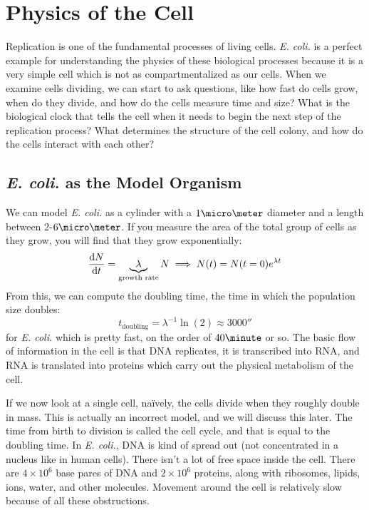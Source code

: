 \documentclass[a4paper,twoside,master.tex]{subfiles}
\begin{document}
\chapter{Physics of the Cell}


Replication is one of the fundamental processes of living cells. \textit{E. coli.} is a perfect example for understanding the physics of these biological processes because it is a very simple cell which is not as compartmentalized as our cells. When we examine cells dividing, we can start to ask questions, like how fast do cells grow, when do they divide, and how do the cells measure time and size? What is the biological clock that tells the cell when it needs to begin the next step of the replication process? What determines the structure of the cell colony, and how do the cells interact with each other?

\section{\textit{E. coli.} as the Model Organism}\label{sec:e_coli_as_the_model_organism}

We can model \textit{E. coli.} as a cylinder with a $ 1\micro\meter $ diameter and a length between $ 2 $-$ 6 \micro\meter $. If you measure the area of the total group of cells as they grow, you will find that they grow exponentially:
\begin{equation}
    \dv{N}{t} = \underbrace{\lambda}_{\text{growth rate}} N \implies N(t) = N(t=0) e^{\lambda t}
\end{equation}
From this, we can compute the doubling time, the time in which the population size doubles:
\begin{equation}
    t_{\text{doubling}} = \lambda^{-1} \ln(2) \approx 3000\second
\end{equation}
for \textit{E. coli.} which is pretty fast, on the order of $ 40\minute $ or so. The basic flow of information in the cell is that DNA replicates, it is transcribed into RNA, and RNA is translated into proteins which carry out the physical metabolism of the cell.


If we now look at a single cell, na\"ively, the cells divide when they roughly double in mass. This is actually an incorrect model, and we will discuss this later. The time from birth to division is called the cell cycle, and that is equal to the doubling time. In \textit{E. coli.}, DNA is kind of spread out (not concentrated in a nucleus like in human cells). There isn't a lot of free space inside the cell. There are $ 4 \times 10^6 $ base pares of DNA and $ 2 \times 10^6 $ proteins, along with ribosomes, lipids, ions, water, and other molecules. Movement around the cell is relatively slow because of all these obstructions.
\end{document}
